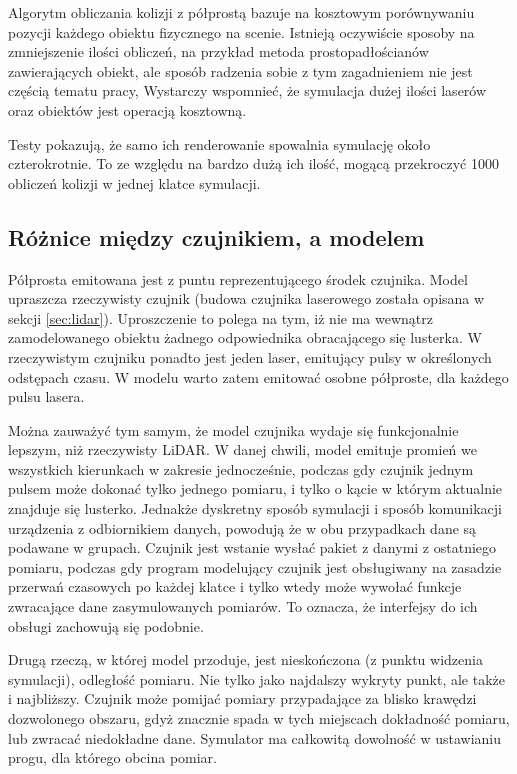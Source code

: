 		Algorytm obliczania kolizji z półprostą bazuje na kosztowym porównywaniu pozycji każdego obiektu fizycznego na scenie.
		Istnieją oczywiście sposoby na zmniejszenie ilości obliczeń, na przykład metoda prostopadłościanów zawierających obiekt, ale sposób radzenia sobie z tym zagadnieniem nie jest
		częścią tematu pracy,
		Wystarczy wspomnieć, że symulacja dużej ilości laserów oraz obiektów jest operacją kosztowną.
		
		Testy pokazują, że samo ich renderowanie spowalnia symulację około czterokrotnie.
		To ze względu na bardzo dużą ich ilość, mogącą przekroczyć 1000 obliczeń kolizji w jednej klatce symulacji.

	\subsection{Różnice między czujnikiem, a modelem}
		Półprosta emitowana jest z puntu reprezentującego środek czujnika.
		Model upraszcza rzeczywisty czujnik (budowa czujnika laserowego została opisana w sekcji \ref{sec:lidar}).
		Uproszczenie to polega na tym, iż nie ma wewnątrz zamodelowanego obiektu żadnego odpowiednika obracającego się lusterka.
		W rzeczywistym czujniku ponadto jest jeden laser, emitujący pulsy w określonych odstępach czasu.
		W modelu warto zatem emitować osobne półproste, dla każdego pulsu lasera.

		Można zauważyć tym samym, że model czujnika wydaje się funkcjonalnie lepszym, niż rzeczywisty LiDAR.
		W danej chwili, model emituje promień we wszystkich kierunkach w zakresie jednocześnie, podczas gdy czujnik jednym pulsem może dokonać tylko jednego pomiaru,
		i tylko o kącie w którym aktualnie znajduje się lusterko.
		Jednakże dyskretny sposób symulacji i sposób komunikacji urządzenia z odbiornikiem danych, powodują że w obu przypadkach dane są podawane w grupach.
		Czujnik jest wstanie wysłać pakiet z danymi z ostatniego pomiaru, podczas gdy program modelujący czujnik jest obsługiwany na zasadzie przerwań czasowych 
		po każdej klatce i tylko wtedy może wywołać funkcje zwracające dane zasymulowanych pomiarów.
		To oznacza, że interfejsy do ich obsługi zachowują się podobnie.

		Drugą rzeczą, w której model przoduje, jest nieskończona (z punktu widzenia symulacji), odległość pomiaru.
		Nie tylko jako najdalszy wykryty punkt, ale także i najbliższy. 
		Czujnik może pomijać pomiary przypadające za blisko krawędzi dozwolonego obszaru, gdyż znacznie spada w tych miejscach dokładność pomiaru, lub zwracać niedokładne dane.
		Symulator ma całkowitą dowolność w ustawianiu progu, dla którego obcina pomiar.

